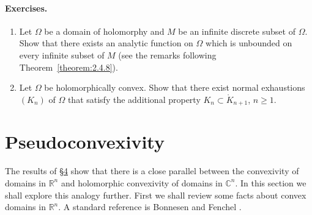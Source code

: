 \paragraph*{Exercises.}
\begin{enumerate}
\item Let $\Omega$ be a domain of holomorphy and $M$ be an infinite discrete subset of $\Omega$. Show that there exists an analytic function on $\Omega$ which is unbounded on every infinite subset of $M$ (see the remarks following Theorem~\ref{theorem:2.4.8}).
\item Let $\Omega$ be holomorphically convex. Show that there exist normal exhaustions $(K_n)$ of $\Omega$ that satisfy the additional property $K_n\subset\mathring K_{n+1}$, $n\geq1$.
\end{enumerate}

\section{Pseudoconvexivity}\label{sec:2:5}
The results of \hyperref[sec:2:4]{\S4} show that there is a close parallel between the convexivity of domains in $\mathbb R^n$ and holomorphic convexivity of domains in $\mathbb C^n$. In this section we shall explore this analogy further. First we shall review some facts about convex domains in $\mathbb R^n$. A standard reference is Bonnesen and Fenchel \cite{bib:I:bonnesen-t-and-fenchel-w:1}.


